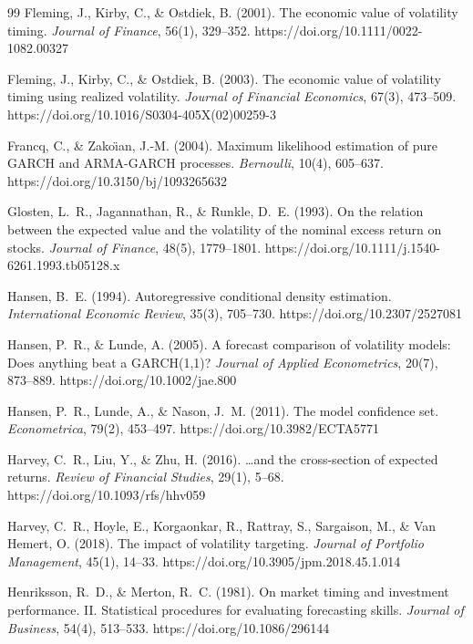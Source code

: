 \documentclass[review,12pt]{elsarticle}
\begin{document}
\begin{thebibliography}{99}
Fleming, J., Kirby, C., \& Ostdiek, B. (2001). The economic value of volatility timing. \textit{Journal of Finance}, 56(1), 329--352. https://doi.org/10.1111/0022-1082.00327

Fleming, J., Kirby, C., \& Ostdiek, B. (2003). The economic value of volatility timing using realized volatility. \textit{Journal of Financial Economics}, 67(3), 473--509. https://doi.org/10.1016/S0304-405X(02)00259-3

Francq, C., \& Zako\"{\i}an, J.-M. (2004). Maximum likelihood estimation of pure GARCH and ARMA-GARCH processes. \textit{Bernoulli}, 10(4), 605--637. https://doi.org/10.3150/bj/1093265632

Glosten, L.~R., Jagannathan, R., \& Runkle, D.~E. (1993). On the relation between the expected value and the volatility of the nominal excess return on stocks. \textit{Journal of Finance}, 48(5), 1779--1801. https://doi.org/10.1111/j.1540-6261.1993.tb05128.x

Hansen, B.~E. (1994). Autoregressive conditional density estimation. \textit{International Economic Review}, 35(3), 705--730. https://doi.org/10.2307/2527081

Hansen, P.~R., \& Lunde, A. (2005). A forecast comparison of volatility models: Does anything beat a GARCH(1,1)? \textit{Journal of Applied Econometrics}, 20(7), 873--889. https://doi.org/10.1002/jae.800

Hansen, P.~R., Lunde, A., \& Nason, J.~M. (2011). The model confidence set. \textit{Econometrica}, 79(2), 453--497. https://doi.org/10.3982/ECTA5771

Harvey, C.~R., Liu, Y., \& Zhu, H. (2016). \ldots and the cross-section of expected returns. \textit{Review of Financial Studies}, 29(1), 5--68. https://doi.org/10.1093/rfs/hhv059

Harvey, C.~R., Hoyle, E., Korgaonkar, R., Rattray, S., Sargaison, M., \& Van Hemert, O. (2018). The impact of volatility targeting. \textit{Journal of Portfolio Management}, 45(1), 14--33. https://doi.org/10.3905/jpm.2018.45.1.014

Henriksson, R.~D., \& Merton, R.~C. (1981). On market timing and investment performance. II. Statistical procedures for evaluating forecasting skills. \textit{Journal of Business}, 54(4), 513--533. https://doi.org/10.1086/296144


\end{thebibliography}
\end{document}
